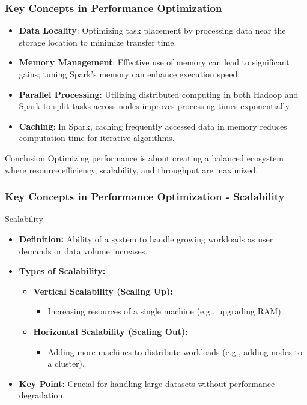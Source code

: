\documentclass{beamer}
\begin{document}
\begin{frame}[fragile]
    \frametitle{Key Concepts in Performance Optimization}
    \begin{itemize}
        \item \textbf{Data Locality}: Optimizing task placement by processing data near the storage location to minimize transfer time.
        \item \textbf{Memory Management}: Effective use of memory can lead to significant gains; tuning Spark's memory can enhance execution speed.
        \item \textbf{Parallel Processing}: Utilizing distributed computing in both Hadoop and Spark to split tasks across nodes improves processing times exponentially.
        \item \textbf{Caching}: In Spark, caching frequently accessed data in memory reduces computation time for iterative algorithms.
    \end{itemize}
    
    \begin{block}{Conclusion}
        Optimizing performance is about creating a balanced ecosystem where resource efficiency, scalability, and throughput are maximized.
    \end{block}
\end{frame}

\begin{frame}[fragile]
    \frametitle{Key Concepts in Performance Optimization - Scalability}
    
    \begin{block}{Scalability}
        \begin{itemize}
            \item \textbf{Definition:} Ability of a system to handle growing workloads as user demands or data volume increases.
            \item \textbf{Types of Scalability:}
            \begin{itemize}
                \item \textbf{Vertical Scalability (Scaling Up):} 
                \begin{itemize}
                    \item Increasing resources of a single machine (e.g., upgrading RAM).
                \end{itemize}
                \item \textbf{Horizontal Scalability (Scaling Out):} 
                \begin{itemize}
                    \item Adding more machines to distribute workloads (e.g., adding nodes to a cluster).
                \end{itemize}
            \end{itemize}
            \item \textbf{Key Point:} Crucial for handling large datasets without performance degradation.
        \end{itemize}
    \end{block}

\end{frame}
\end{document}
